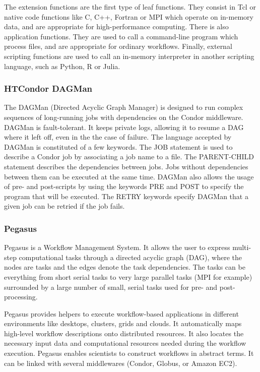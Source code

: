 The extension functions are the first type of leaf functions.
They consist in Tcl or native code functions like C, C++, Fortran or MPI which operate on in-memory data, and are appropriate for high-performance computing.
There is also application functions.
They are used to call a command-line program which process files, and are appropriate for ordinary workflows.
Finally, external scripting functions are used to call an in-memory interpreter in another scripting language, such as Python, R or Julia.

\subsubsection{HTCondor DAGMan}
The DAGMan (Directed Acyclic Graph Manager) \cite{ThaTL2005} is designed to run complex sequences of long-running jobs with dependencies on the Condor \cite{ThaTL2002} \cite{CKRWW2007} middleware.
DAGMan is fault-tolerant.
It keeps private logs, allowing it to resume a DAG where it left off, even in the the case of failure.
The language accepted by DAGMan is constituted of a few keywords.
The JOB statement is used to describe a Condor job by associating a job name to a file.
The PARENT-CHILD statement describes the dependencies between jobs.
Jobs without dependencies between them can be executed at the same time.
DAGMan also allows the usage of pre- and post-scripts by using the keywords PRE and POST to specify the program that will be executed.
The RETRY keywords specify DAGMan that a given job can be retried if the job fails.

\subsubsection{Pegasus}
Pegasus \cite{DSSBG2005} is a Workflow Management System.
It allows the user to express multi-step computational tasks through a directed acyclic graph (DAG), where the nodes are tasks and the edges denote the task dependencies.
The tasks can be everything  from short serial tasks to very large parallel tasks (MPI for example) surrounded by a large number of small, serial tasks used for pre- and post-processing.

Pegasus provides helpers to execute workflow-based applications in different environments like desktops, clusters, grids and clouds.
It automatically maps high-level workflow descriptions onto distributed resources.
It also locates the necessary input data and computational resources needed during the workflow execution.
Pegasus enables scientists to construct workflows in abstract terms.
It can be linked with several middlewares (Condor, Globus, or Amazon EC2).

